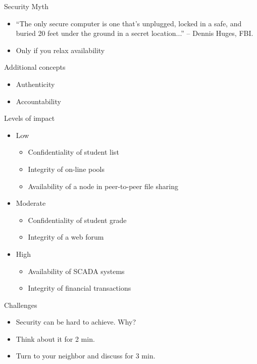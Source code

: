 \documentclass{beamer}
\begin{document}
\begin{frame}{Security Myth}
  
  \begin{itemize}
\item   ``The only secure computer is one that's unplugged, locked in a safe,
  and buried 20 feet under the ground in a secret location...'' --
  Dennis Huges, FBI.
\item<2-> Only if you relax availability
  \end{itemize}
\end{frame}

\begin{frame}{Additional concepts}
  \begin{itemize}
  \item Authenticity
  \item Accountability
  \end{itemize}
\end{frame}  

\begin{frame}{Levels of impact}
  \begin{itemize}
  \item Low
    \begin{itemize}
      \item Confidentiality of student list
      \item Integrity of on-line pools
      \item Availability of a node in peer-to-peer file sharing
    \end{itemize}
  \item Moderate    
    \begin{itemize}
      \item Confidentiality of student grade
      \item Integrity of a web forum
    \end{itemize}
  \item High
    \begin{itemize}
      \item Availability of SCADA systems
      \item Integrity of financial transactions
    \end{itemize}
  \end{itemize}
\end{frame}

\begin{frame}{Challenges}
  \begin{itemize}
  \item Security can be hard to achieve. Why? 
  \item Think about it for 2 min. 
  \item Turn to your neighbor and discuss for 3 min.
  \end{itemize}
\end{frame}
 
\end{document}
